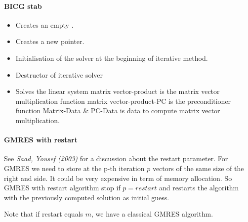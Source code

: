 \paragraph{BICG stab}
\begin{itemize}
  \item {}
    \sshortdescribe Creates an empty .  
\item {}
  \sshortdescribe Creates a new  pointer.  
\item {}
  \sshortdescribe Initialisation of the solver at the beginning of iterative method.  
\item {}
  \sshortdescribe Destructor of iterative solver  
\item {}
  \sshortdescribe Solves the linear system matrix vector-product is the matrix vector multiplication function matrix vector-product-PC is the preconditioner function Matrix-Data \& PC-Data is data to compute matrix vector multiplication.  
\end{itemize}

\paragraph{GMRES with restart} See {\em Saad, Yousef (2003)} for a discussion
about the restart parameter. For GMRES we need to store at the p-th iteration
$p$ vectors of the same size of the right and side. It could be very expensive
in term of memory allocation. So GMRES with restart algorithm stop if
$p=restart$ and restarts the algorithm with the previously computed solution
as initial guess.

Note that if restart equals $m$, we have a classical GMRES algorithm.

